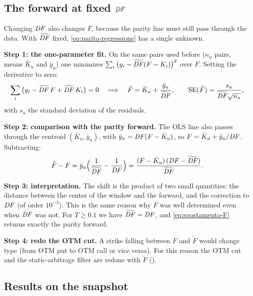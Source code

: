\subsection{The forward at fixed \texorpdfstring{$\mathit{DF}$}{DF}}
Changing $\mathit{DF}$ also changes $F$, because the parity line must still pass through the data. With $\widetilde{\mathit{DF}}$
fixed, \eqref{eq:parita-regressione} has a single unknown.

\textbf{Step 1: the one-parameter fit.} On the same pairs used before ($n_u$ pairs, means $\bar K_u$ and $\bar y_u$)
one minimizes $\sum_i\big(y_i-\widetilde{\mathit{DF}}(F-K_i)\big)^2$ over $F$. Setting the derivative to zero:
\[
\sum_i\big(y_i-\widetilde{\mathit{DF}}\,F+\widetilde{\mathit{DF}}\,K_i\big)=0
\quad\Longrightarrow\quad
\tilde F=\bar K_u+\frac{\bar y_u}{\widetilde{\mathit{DF}}},\qquad
\mathrm{SE}(\tilde F)=\frac{s_u}{\widetilde{\mathit{DF}}\sqrt{n_u}},
\]
with $s_u$ the standard deviation of the residuals.

\textbf{Step 2: comparison with the parity forward.} The OLS line also passes through the centroid
$(\bar K_u,\bar y_u)$, with $\bar y_u=\mathit{DF}(F-\bar K_u)$, so $F=\bar K_u+\bar y_u/\mathit{DF}$. Subtracting:
\begin{equation}\label{eq:spostamento-F}
\tilde F-F=\bar y_u\Big(\frac1{\widetilde{\mathit{DF}}}-\frac1{\mathit{DF}}\Big)
=\frac{(F-\bar K_u)\,(\mathit{DF}-\widetilde{\mathit{DF}})}{\widetilde{\mathit{DF}}} .
\end{equation}

\textbf{Step 3: interpretation.} The shift is the product of two small quantities: the distance between the center
of the window and the forward, and the correction to $\mathit{DF}$ (of order $10^{-3}$). This is the same reason why $F$ was
well determined even when $\mathit{DF}$ was not. For $T\ge0.1$ we have $\widetilde{\mathit{DF}}=\mathit{DF}$, and \eqref{eq:spostamento-F}
returns exactly the parity forward.

\textbf{Step 4: redo the OTM cut.} A strike falling between $F$ and $\tilde F$ would change type (from OTM put to
OTM call or vice versa). For this reason the OTM cut and the static-arbitrage filter are redone with $\tilde F$
().

\subsection{Results on the snapshot}

